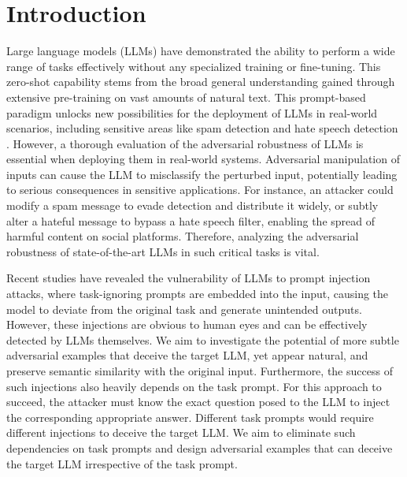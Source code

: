 \documentclass[11pt]{article}
\begin{document}
\section{Introduction}
Large language models (LLMs) have demonstrated the ability to perform a wide range of tasks effectively \cite{ wang2024adaptablereliabletextclassification} without any specialized training or fine-tuning. This zero-shot capability stems from the broad general understanding gained through extensive pre-training on vast amounts of natural text. This prompt-based paradigm unlocks new possibilities for the deployment of LLMs in real-world scenarios, including sensitive areas like spam detection \cite{wang2024adaptablereliabletextclassification} and hate speech detection \cite{guo2024investigationlargelanguagemodels, 10.1145/3543873.3587368,roy-etal-2023-probing,ziems2024largelanguagemodelstransform}. However, a thorough evaluation of the adversarial robustness of LLMs is essential when deploying them in real-world systems. Adversarial manipulation of inputs can cause the LLM to misclassify the perturbed input, potentially leading to serious consequences in sensitive applications. For instance, an attacker could modify a spam message to evade detection and distribute it widely, or subtly alter a hateful message to bypass a hate speech filter, enabling the spread of harmful content on social platforms. Therefore, analyzing the adversarial robustness of state-of-the-art LLMs in such critical tasks is vital.

Recent studies \cite{299563, Branch2022EvaluatingTS, Perez2022IgnorePP} have revealed the vulnerability of LLMs to prompt injection attacks, where task-ignoring prompts are embedded into the input, causing the model to deviate from the original task and generate unintended outputs. However, these injections are obvious to human eyes and can be effectively detected by LLMs \cite{299563} themselves. We aim to investigate the potential of more subtle adversarial examples that deceive the target LLM, yet appear natural, and preserve semantic similarity with the original input. Furthermore, the success of such injections also heavily depends on the task prompt. For this approach to succeed, the attacker must know the exact question posed to the LLM to inject the corresponding appropriate answer.  Different task prompts would require different injections to deceive the target LLM. We aim to eliminate such dependencies on task prompts and design adversarial examples that can deceive the target LLM irrespective of the task prompt.
\end{document}

